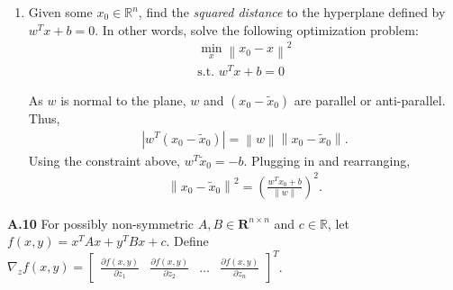\documentclass{article}
\newcommand{\norm}[1]{\left\|#1\right\|}
\newenvironment{solution}{\begin{adjustwidth}{8mm}{}}{\end{adjustwidth}}
\begin{document}
\begin{enumerate}
\begin{solution}
\begin{figure}[h]
\begin{subfigure}{0.40\linewidth}
\begin{verbatim}
                                        x1 = np.linspace(-10,10)
                                        x2 = np.linspace(-10,10)
                                        x1grid, x2grid = np.meshgrid(x1,x2)
                                        x3grid = -x1grid - x2grid

                                        fig = plt.figure(constrained_layout=True)
                                        ax = plt.axes(projection='3d')

                                        ax.contour3D(x1grid, x2grid, x3grid, 300)
                                        ax.set_xlabel("$x_1$")
                                        ax.set_ylabel("$x_2$")
                                        ax.set_zlabel("$x_3$")
                                        ax.dist=11
                                \end{verbatim}
                        \end{subfigure}  
                \end{figure}
        \end{solution}
        \item Given some $x_0 \in \mathbb{R}^n$, find the \textit{squared distance} to the hyperplane defined by $w^Tx+b=0$.
        In other words, solve the following optimization problem:
        \begin{align*}
                \min_x \norm{x_0 - x}^2 \\
                \text{s.t. } w^Tx+b = 0
        \end{align*}
        \begin{solution}
                As $w$ is normal to the plane, $w$ and $(x_0 - \tilde{x}_0)$ are parallel or anti-parallel.
                Thus, 
                \begin{align*}
                        |w^T (x_0 - \tilde{x}_0)| = \norm{w} \norm{x_0 - \tilde{x}_0}.
                \end{align*}
                Using the constraint above, $w^T \tilde{x}_0 = -b$.
                Plugging in and rearranging,
                \begin{align*}
                        \norm{x_0 - \tilde{x}_0}^2 = \left( \frac{w^T x_0 + b}{\norm{w}} \right)^2.
                \end{align*}
        \end{solution}
\end{enumerate}


\textbf{A.10}
For possibly non-symmetric $A,B \in \mathbf{R}^{n \times n}$ and $c \in \mathbb{R}$, let $f(x,y) = x^T A x + y^T B x + c$.
Define $\nabla_z f(x,y) = \begin{bmatrix}
        \frac{\partial f(x,y)}{\partial z_1} &
        \frac{\partial f(x,y)}{\partial z_2} &
        \dots &
        \frac{\partial f(x,y)}{\partial z_n}
\end{bmatrix}^T$.
\end{document}
